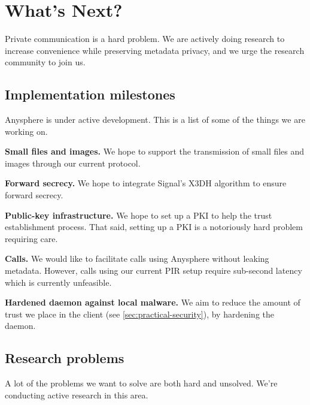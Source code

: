 \section{What's Next?}
\label{sec:future}

Private communication is a hard problem. We are actively doing research to increase convenience while preserving metadata privacy, and we urge the research community to join us.


\subsection{Implementation milestones}
Anysphere is under active development. This is a list of some of the things we are working on.

\textbf{Small files and images.} We hope to support the transmission of small files and images through our current protocol.

\textbf{Forward secrecy.} We hope to integrate Signal's X3DH algorithm to ensure forward secrecy.

\textbf{Public-key infrastructure.} We hope to set up a PKI to help the trust establishment process. That said, setting up a PKI is a notoriously hard problem requiring care.

\textbf{Calls.} We would like to facilitate calls using Anysphere without leaking metadata. However, calls using our current PIR setup require sub-second latency which is currently unfeasible.

\textbf{Hardened daemon against local malware.} We aim to reduce the amount of trust we place in the client (see \cref{sec:practical-security}), by hardening the daemon.

\subsection{Research problems} 
A lot of the problems we want to solve are both hard and unsolved. We're conducting active research in this area.

